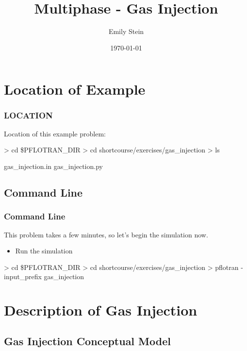 \documentclass{beamer}
\begin{document}
\title{Multiphase - Gas Injection}
\author{Emily Stein}
\date{\today}


\section{Location of Example}

\begin{frame}\frametitle{LOCATION}

Location of this example problem:

\begin{semiverbatim}
> cd \$PFLOTRAN_DIR
> cd shortcourse/exercises/gas_injection
> ls

gas_injection.in
gas_injection.py
\end{semiverbatim}

\end{frame}

\subsection{Command Line}
\begin{frame}[fragile]\frametitle{Command Line}
This problem takes a few minutes, so let's begin the simulation now.

\begin{itemize}
  \item Run the simulation
\end{itemize}

\begin{semiverbatim}
> cd \$PFLOTRAN_DIR
> cd shortcourse/exercises/gas_injection
> pflotran -input_prefix gas_injection
\end{semiverbatim}

\end{frame}

\section{Description of Gas Injection}

\subsection{Gas Injection Conceptual Model}
\end{document}
